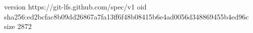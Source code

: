 version https://git-lfs.github.com/spec/v1
oid sha256:ed2bcfac8b09dd26867a7fa13ff6f48b08415b6e4ad0056d348869455b4ed96c
size 2872
